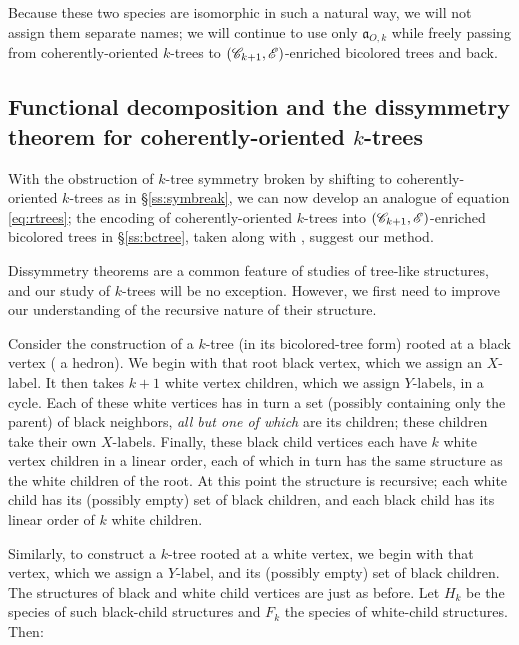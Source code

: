 \documentclass[sectionflow,singlespace,twoside,boldmathhdr]{brandiss} %
\numberwithin{section}{chapter}
\numberwithin{figure}{chapter}
\begin{document}
Because these two species are isomorphic in such a natural way, we will not assign them separate names; we will continue to use only $\mathfrak{a}_{O, k}$ while freely passing from coherently-oriented $k$-trees to $\left( {\mathscr{C}_{k+1}, \mathscr{E}} \right)$-enriched bicolored trees and back.

\subsection{Functional decomposition and the dissymmetry theorem for coherently-oriented $k$-trees}\label{ss:codecomp}
With the obstruction of $k$-tree symmetry broken by shifting to coherently-oriented $k$-trees as in \S \ref{ss:symbreak}, we can now develop an analogue of equation \eqref{eq:rtrees}; the encoding of coherently-oriented $k$-trees into $\left( {\mathscr{C}_{k+1}, \mathscr{E}} \right)$-enriched bicolored trees in \S \ref{ss:bctree}, taken along with \cite[\S 3.2]{bll:species}, suggest our method.

Dissymmetry theorems are a common feature of studies of tree-like structures, and our study of $k$-trees will be no exception.
However, we first need to improve our understanding of the recursive nature of their structure.

Consider the construction of a $k$-tree (in its bicolored-tree form) rooted at a black vertex ( a hedron).
We begin with that root black vertex, which we assign an $X$-label.
It then takes $k+1$ white vertex children, which we assign $Y$-labels, in a cycle.
Each of these white vertices has in turn a set (possibly containing only the parent) of black neighbors, \emph{all but one of which} are its children; these children take their own $X$-labels.
Finally, these black child vertices each have $k$ white vertex children in a linear order, each of which in turn has the same structure as the white children of the root.
At this point the structure is recursive; each white child has its (possibly empty) set of black children, and each black child has its linear order of $k$ white children.

Similarly, to construct a $k$-tree rooted at a white vertex, we begin with that vertex, which we assign a $Y$-label, and its (possibly empty) set of black children.
The structures of black and white child vertices are just as before.
Let $H_{k}$ be the species of such black-child structures and $F_{k}$ the species of white-child structures. Then:
\end{document}
